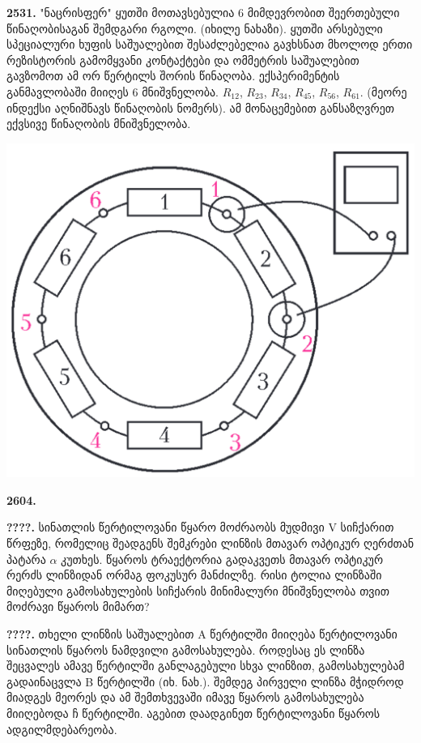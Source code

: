 \documentclass[12pt,a4paper,]{report}
\begin{document}
\textbf{2531.} "ნაცრისფერ" ყუთში მოთავსებულია 6 მიმდევრობით შეერთებული წინაღობისაგან შემდგარი რგოლი. (იხილე ნახაზი). ყუთში არსებული სპეციალური ხუფის საშუალებით შესაძლებელია გავხსნათ მხოლოდ ერთი რეზისტორის გამომყვანი კონტაქტები და ომმეტრის საშუალებით გავზომოთ ამ ორ წერტილს შორის წინაღობა. ექსპერიმენტის განმავლობაში მიიღეს 6 მნიშვნელობა. $R_{12}$, $R_{23}$, $R_{34}$, $R_{45}$, $R_{56}$, $R_{61}$. (მეორე ინდექსი აღნიშნავს წინაღობის ნომერს). ამ მონაცემებით განსაზღვრეთ ექვსივე წინაღობის მნიშვნელობა.
	\begin{center}
		\includegraphics[scale=0.3]{images/F2531.png}
	\end{center}

\textbf{2604.} 

\newpage

\textbf{????.} სინათლის წერტილოვანი წყარო მოძრაობს მუდმივი V სიჩქარით წრფეზე, რომელიც შეადგენს შემკრები ლინზის მთავარ ოპტიკურ ღერძთან  პატარა $\alpha$ კუთხეს. წყაროს ტრაექტორია გადაკვეთს მთავარ ოპტიკურ რერძს ლინზიდან ორმაგ ფოკუსურ მანძილზე. რისი ტოლია ლინზაში მიღებული გამოსახულების სიჩქარის მინიმალური მნიშვნელობა თვით მოძრავი წყაროს მიმართ?

\textbf{????.} თხელი ლინზის საშუალებით A წერტილში მიიღება წერტილოვანი სინათლის წყაროს ნამდვილი გამოსახულება. როდესაც ეს ლინზა შეცვალეს ამავე წერტილში განლაგებული სხვა ლინზით, გამოსახულებამ გადაინაცვლა B წერტილში (იხ. ნახ.). შემდეგ პირველი ლინზა მჭიდროდ მიადგეს მეორეს და ამ შემთხვევაში იმავე წყაროს გამოსახულება მიიღებოდა ჩ წერტილში. აგებით დაადგინეთ წერტილოვანი წყაროს ადგილმდებარეობა.
\end{document}
